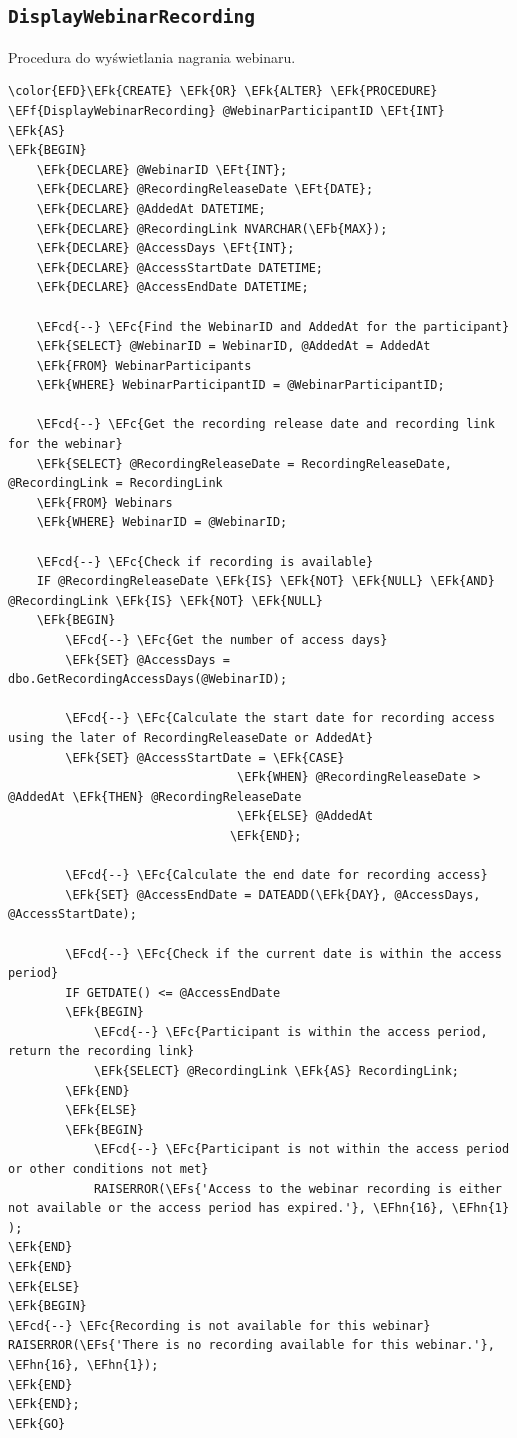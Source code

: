 \documentclass[11pt]{article}
\newcommand{\EFc}[1]{\textcolor{EFc}{\textit{#1}}} %
\newcommand{\EFcd}[1]{\textcolor{EFcd}{\textit{#1}}} %
\newcommand{\EFs}[1]{\textcolor{EFs}{#1}} %
\newcommand{\EFk}[1]{\textcolor{EFk}{\textbf{#1}}} %
\newcommand{\EFb}[1]{\textcolor{EFb}{\textbf{#1}}} %
\newcommand{\EFf}[1]{\textcolor{EFf}{#1}} %
\newcommand{\EFt}[1]{\textcolor{EFt}{\textbf{#1}}} %
\newcommand{\EFhn}[1]{\textcolor{EFhn}{#1}} %
\begin{document}
\subsection{\texttt{DisplayWebinarRecording}}
\label{sec:orgce7f698}
Procedura do wyświetlania nagrania webinaru.
\begin{Code}
\begin{Verbatim}
\color{EFD}\EFk{CREATE} \EFk{OR} \EFk{ALTER} \EFk{PROCEDURE} \EFf{DisplayWebinarRecording} @WebinarParticipantID \EFt{INT}
\EFk{AS}
\EFk{BEGIN}
    \EFk{DECLARE} @WebinarID \EFt{INT};
    \EFk{DECLARE} @RecordingReleaseDate \EFt{DATE};
    \EFk{DECLARE} @AddedAt DATETIME;
    \EFk{DECLARE} @RecordingLink NVARCHAR(\EFb{MAX});
    \EFk{DECLARE} @AccessDays \EFt{INT};
    \EFk{DECLARE} @AccessStartDate DATETIME;
    \EFk{DECLARE} @AccessEndDate DATETIME;

    \EFcd{--} \EFc{Find the WebinarID and AddedAt for the participant}
    \EFk{SELECT} @WebinarID = WebinarID, @AddedAt = AddedAt
    \EFk{FROM} WebinarParticipants
    \EFk{WHERE} WebinarParticipantID = @WebinarParticipantID;

    \EFcd{--} \EFc{Get the recording release date and recording link for the webinar}
    \EFk{SELECT} @RecordingReleaseDate = RecordingReleaseDate, @RecordingLink = RecordingLink
    \EFk{FROM} Webinars
    \EFk{WHERE} WebinarID = @WebinarID;

    \EFcd{--} \EFc{Check if recording is available}
    IF @RecordingReleaseDate \EFk{IS} \EFk{NOT} \EFk{NULL} \EFk{AND} @RecordingLink \EFk{IS} \EFk{NOT} \EFk{NULL}
    \EFk{BEGIN}
        \EFcd{--} \EFc{Get the number of access days}
        \EFk{SET} @AccessDays = dbo.GetRecordingAccessDays(@WebinarID);

        \EFcd{--} \EFc{Calculate the start date for recording access using the later of RecordingReleaseDate or AddedAt}
        \EFk{SET} @AccessStartDate = \EFk{CASE} 
                                \EFk{WHEN} @RecordingReleaseDate > @AddedAt \EFk{THEN} @RecordingReleaseDate 
                                \EFk{ELSE} @AddedAt 
                               \EFk{END};

        \EFcd{--} \EFc{Calculate the end date for recording access}
        \EFk{SET} @AccessEndDate = DATEADD(\EFk{DAY}, @AccessDays, @AccessStartDate);

        \EFcd{--} \EFc{Check if the current date is within the access period}
        IF GETDATE() <= @AccessEndDate
        \EFk{BEGIN}
            \EFcd{--} \EFc{Participant is within the access period, return the recording link}
            \EFk{SELECT} @RecordingLink \EFk{AS} RecordingLink;
        \EFk{END}
        \EFk{ELSE}
        \EFk{BEGIN}
            \EFcd{--} \EFc{Participant is not within the access period or other conditions not met}
            RAISERROR(\EFs{'Access to the webinar recording is either not available or the access period has expired.'}, \EFhn{16}, \EFhn{1}
);
\EFk{END}
\EFk{END}
\EFk{ELSE}
\EFk{BEGIN}
\EFcd{--} \EFc{Recording is not available for this webinar}
RAISERROR(\EFs{'There is no recording available for this webinar.'}, \EFhn{16}, \EFhn{1});
\EFk{END}
\EFk{END};
\EFk{GO}
\end{Verbatim}
\end{Code}
\end{document}
